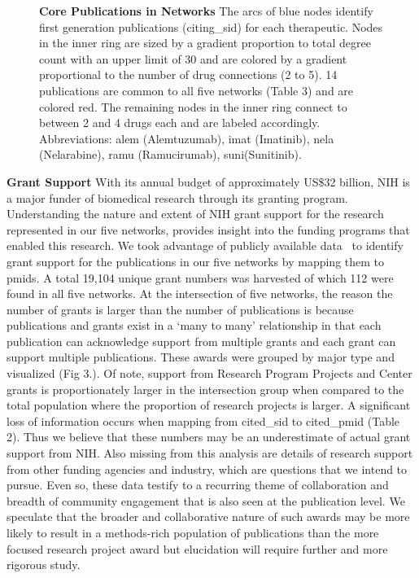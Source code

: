 \documentclass[10pt,letterpaper]{article}
\begin{document}
\begin{figure}[!h]
\begin{adjustwidth}{-0.5in}{0in} %
\centering
{}
\caption{{\bf Core Publications in Networks}  The arcs of blue nodes identify first generation publications (citing\_sid) for each therapeutic. Nodes in the inner ring are sized by a gradient proportion to total degree count with an upper limit of 30 and are colored by a gradient proportional to the number of drug connections (2 to 5). 14  publications are common to all five networks (Table 3) and are colored red. The remaining nodes in the inner ring connect to between 2 and 4 drugs each and are labeled accordingly. Abbreviations: alem (Alemtuzumab), imat (Imatinib), nela (Nelarabine), ramu (Ramucirumab), suni(Sunitinib).}
\label{fig2}
\end{adjustwidth}
\end{figure}

\textbf{Grant Support} With its annual budget of approximately US\$32 billion, NIH is a major funder of biomedical research through its granting program. Understanding the nature and extent of NIH grant support for the research represented in our five networks, provides insight into the funding programs that enabled this research. We took advantage of publicly available data~\cite{bibNIHExPORTER} to identify grant support for the publications in our five networks by mapping them to pmids. A total 19,104 unique grant numbers was harvested of which 112 were found in all five networks. At the intersection of five networks, the reason the number of grants is larger than the number of publications is because publications and grants exist in a `many to many' relationship in that each publication can acknowledge support from multiple grants and each grant can support multiple publications. These awards were grouped by major type  and visualized (Fig 3.). Of note, support from Research Program Projects and Center grants is proportionately larger in the intersection group when compared to the total population where the proportion of research projects is larger. A significant loss of information occurs when mapping from cited\_sid to cited\_pmid (Table 2). Thus we believe that these numbers may be an underestimate of actual grant support from NIH. Also missing from this analysis are details of research support from other funding agencies and industry, which are questions that we intend to pursue. Even so, these data testify to a recurring theme of collaboration and breadth of community engagement that is also seen at the publication level. We speculate that the broader and collaborative nature of such awards may be more likely to result in a methods-rich population of publications than the more focused research project award but elucidation will require further and more rigorous study. 
\end{document}
